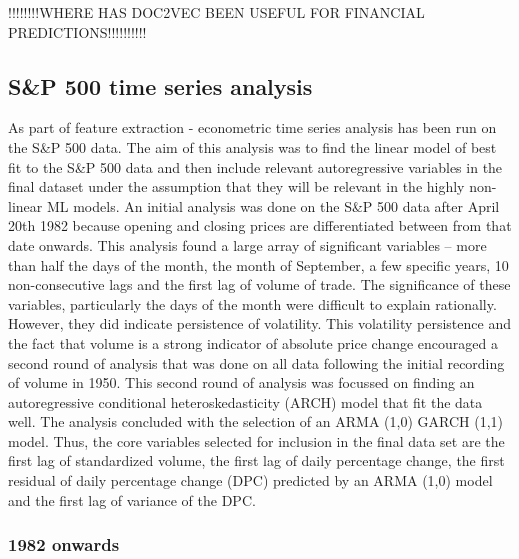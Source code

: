 \documentclass[11pt,preprint, authoryear]{elsarticle}
\numberwithin{equation}{section}
\numberwithin{figure}{section}
\numberwithin{table}{section}
\begin{document}
!!!!!!!!WHERE HAS DOC2VEC BEEN USEFUL FOR FINANCIAL
PREDICTIONS!!!!!!!!!!

\hypertarget{sp-500-time-series-analysis}{%
\subsection{S\&P 500 time series
analysis}\label{sp-500-time-series-analysis}}

As part of feature extraction - econometric time series analysis has
been run on the S\&P 500 data. The aim of this analysis was to find the
linear model of best fit to the S\&P 500 data and then include relevant
autoregressive variables in the final dataset under the assumption that
they will be relevant in the highly non-linear ML models. An initial
analysis was done on the S\&P 500 data after April 20th 1982 because
opening and closing prices are differentiated between from that date
onwards. This analysis found a large array of significant variables --
more than half the days of the month, the month of September, a few
specific years, 10 non-consecutive lags and the first lag of volume of
trade. The significance of these variables, particularly the days of the
month were difficult to explain rationally. However, they did indicate
persistence of volatility. This volatility persistence and the fact that
volume is a strong indicator of absolute price change encouraged a
second round of analysis that was done on all data following the initial
recording of volume in 1950. This second round of analysis was focussed
on finding an autoregressive conditional heteroskedasticity (ARCH) model
that fit the data well. The analysis concluded with the selection of an
ARMA (1,0) GARCH (1,1) model. Thus, the core variables selected for
inclusion in the final data set are the first lag of standardized
volume, the first lag of daily percentage change, the first residual of
daily percentage change (DPC) predicted by an ARMA (1,0) model and the
first lag of variance of the DPC.

\hypertarget{onwards}{%
\subsubsection{1982 onwards}\label{onwards}}
\end{document}
